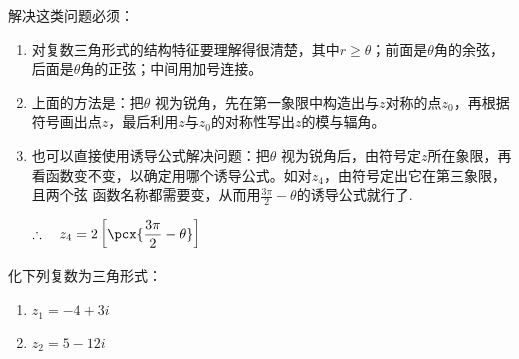 \begin{rmk}
    解决这类问题必须：
\begin{enumerate}[(1)]
\item 对复数三角形式的结构特征要理解得很清楚，其中$r\ge \theta$；前面是$\theta$角的余弦，后面是$\theta$角的正弦；中间用加号连接。
\item 上面的方法是：把$\theta$ 视为锐角，先在第一象限中构造出与$z$对称的点$z_0$，再根据符号画出点$z$，最后利用$z$与$z_0$的对称性写出$z$的模与辐角。
\item 也可以直接使用诱导公式解决问题：把$\theta$ 视为锐角后，由符号定$z$所在象限，再看函数变不变，以确定用哪个诱导公式。如对$z_4$，由符号定出它在第三象限，且两个弦
函数名称都需要变，从而用$\frac{3\pi}{2}-\theta$的诱导公式就行了.   

$\therefore\quad z_4=2\left[\pcx{\frac{3\pi}{2}-\theta}\right]$
\end{enumerate}
\end{rmk}

\begin{example}
化下列复数为三角形式：
\begin{multicols}{2}
\begin{enumerate}[(1)]
    \item $z_1=-4+3i$
    \item $z_2=5-12i$
\end{enumerate}
\end{multicols}
\end{example}

